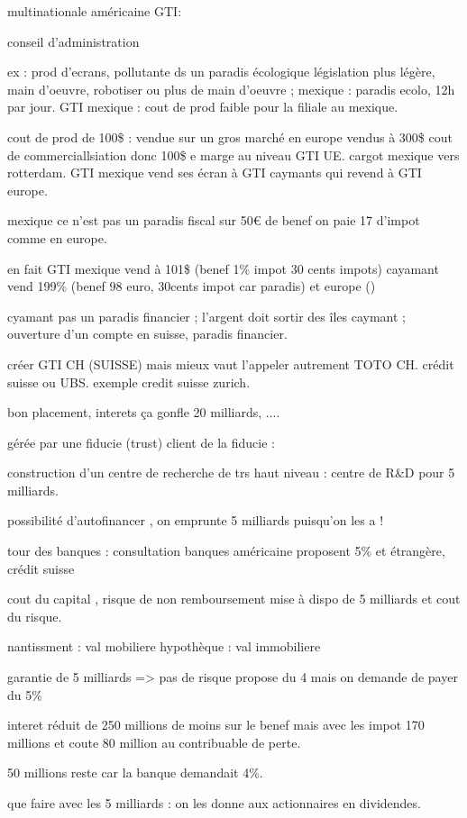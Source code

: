 \documentclass[a4paper,12pt]{article}
\begin{document}
multinationale américaine GTI:

conseil d'administration

ex : prod d'ecrans, pollutante ds un paradis écologique législation plus légère,
main d'oeuvre, robotiser ou plus de main d'oeuvre ; mexique : paradis ecolo, 12h par jour.
GTI mexique : cout de prod faible pour la filiale au mexique.

cout de prod de 100\$ : vendue sur un gros marché en europe vendus à 300\$ cout de commerciallsiation donc 100\$ e marge
au niveau GTI UE. cargot mexique vers rotterdam. GTI mexique vend ses écran à GTI caymants qui revend à GTI europe.

mexique ce n'est pas un paradis fiscal sur 50€ de benef on paie 17 d'impot comme en europe.

en fait GTI mexique vend à 101\$ (benef 1\% impot 30 cents impots)  cayamant vend 199\% (benef 98 euro, 30cents impot car paradis) et europe ()


cyamant pas un paradis financier ; l'argent doit sortir des îles caymant ; ouverture d'un compte en suisse, paradis financier.  

créer GTI CH (SUISSE) mais mieux vaut l'appeler autrement TOTO CH. crédit suisse ou UBS.
exemple credit suisse zurich.

bon placement, interets ça gonfle 20 milliards, ....

gérée par une fiducie (trust)
client de la fiducie : 

construction d'un centre de recherche de trs haut niveau : centre de R\&D pour 5 milliards.

possibilité d'autofinancer , on emprunte 5 milliards puisqu'on les a !

tour des banques : consultation banques américaine proposent 5\% et étrangère, crédit suisse 

cout du capital  , risque de non remboursement  mise à dispo de 5 milliards et cout du risque.

nantissment : val mobiliere 
hypothèque : val immobiliere

garantie de 5 milliards => pas de risque
propose du 4 mais on demande de payer du  5\%

interet réduit de 250 millions de moins sur le benef
mais avec les impot 170 millions et coute 80 million au contribuable de perte.

50 millions reste car la banque demandait 4\%.

que faire avec les 5 milliards : on les donne aux actionnaires en dividendes. 
\end{document}
